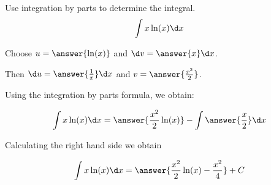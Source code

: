 \documentclass{ximera}
\author{Jason Miller}
\begin{document}
\begin{exercise}
Use integration by parts to determine the integral.
\[
\int x \ln(x) \d x 
\]


Choose $u=\answer{ \ln(x) }$ and $\d v=\answer{x }\d x$. 

Then $\d u= \answer{ \frac{1}{x} } \d x$ and $v= \answer{\frac{x^{2}}{2}}$.

Using the integration by parts formula, we obtain:

\[
\int x \ln(x) \d x= \answer{\frac{x^{2}}{2} \ln(x)} - \int \answer{ \frac{x}{2}  } \d x
\]

Calculating the right hand side we obtain

\[
\int x \ln(x) \d x= \answer{\frac{x^{2}}{2} \ln(x) -\frac{ x^{2}  }{4} } + C
\]


\end{exercise}
\end{document}
